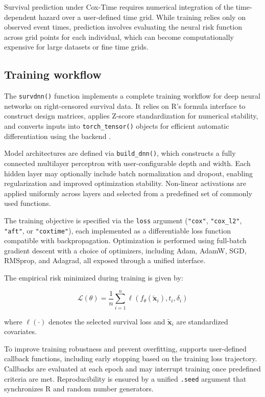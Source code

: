 Survival prediction under Cox-Time requires numerical integration of the time-dependent hazard over a user-defined time grid. While training relies only on observed event times, prediction involves evaluating the neural risk function across grid points for each individual, which can become computationally expensive for large datasets or fine time grids.

\subsection{Training workflow}\label{training-workflow}

The \texttt{survdnn()} function implements a complete training workflow for deep neural networks on right-censored survival data. It relies on R's formula interface to construct design matrices, applies Z-score standardization for numerical stability, and converts inputs into \texttt{torch\_tensor()} objects for efficient automatic differentiation using the  backend \citep{keydana2023deep}.

Model architectures are defined via \texttt{build\_dnn()}, which constructs a fully connected multilayer perceptron with user-configurable depth and width. Each hidden layer may optionally include batch normalization and dropout, enabling regularization and improved optimization stability. Non-linear activations are applied uniformly across layers and selected from a predefined set of commonly used functions.

The training objective is specified via the \texttt{loss} argument (\texttt{"cox"}, \texttt{"cox\_l2"}, \texttt{"aft"}, or \texttt{"coxtime"}), each implemented as a differentiable loss function compatible with backpropagation. Optimization is performed using full-batch gradient descent with a choice of optimizers, including Adam, AdamW, SGD, RMSprop, and Adagrad, all exposed through a unified interface.

The empirical risk minimized during training is given by:

\[
\mathcal{L}(\theta)
= \frac{1}{n}
\sum_{i=1}^n
\ell\!\left(f_\theta(\tilde{\mathbf{x}}_i), t_i, \delta_i\right)
\]

where \(\ell(\cdot)\) denotes the selected survival loss and \(\tilde{\mathbf{x}}_i\) are standardized covariates.

To improve training robustness and prevent overfitting,  supports user-defined callback functions, including early stopping based on the training loss trajectory. Callbacks are evaluated at each epoch and may interrupt training once predefined criteria are met. Reproducibility is ensured by a unified \texttt{.seed} argument that synchronizes R and  random number generators.

